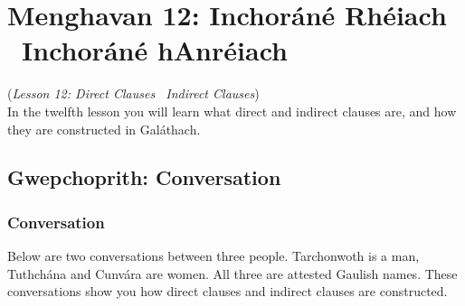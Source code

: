 \section{Menghavan 12: Inchor\'{a}n\'{e} Rh\'{e}iach \textendash\ Inchor\'{a}n\'{e} hAnr\'{e}iach}
(\textit{Lesson 12: Direct Clauses \textendash\ Indirect Clauses})\\

In the twelfth lesson you will learn what direct and indirect clauses are, and how they are constructed in Gal\'{a}thach.

\subsection{Gwepchoprith: Conversation}

\subsubsection{Conversation}

Below are two conversations between three people. Tarchonwoth is a man, Tuthch\'{a}na and Cunv\'{a}ra are women. All three are attested Gaulish names. These conversations show you how direct clauses and indirect clauses are constructed.

